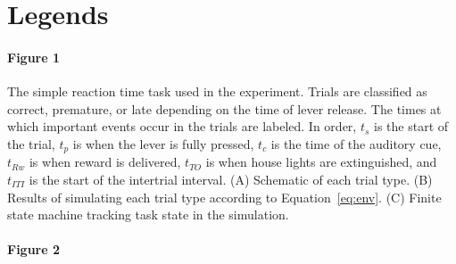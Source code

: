 \documentclass[11pt]{article}
\begin{document}
\section{Legends}

\paragraph{Figure 1}

The simple reaction time task used in the experiment.
Trials are classified as correct, premature, or late
depending on the time of lever release.
The times at which important events occur
in the trials are labeled.
In order, $t_s$ is the start of the trial,
$t_p$ is when the lever is fully pressed,
$t_c$ is the time of the auditory cue,
$t_{Rw}$ is when reward is delivered,
$t_{TO}$ is when house lights are extinguished,
and $t_{ITI}$ is the start of the intertrial interval.
(A) Schematic of each trial type.
(B) Results of simulating each trial type
according to Equation~\eqref{eq:env}.
(C) Finite state machine tracking
task state in the simulation.

\paragraph{Figure 2}
\end{document}

